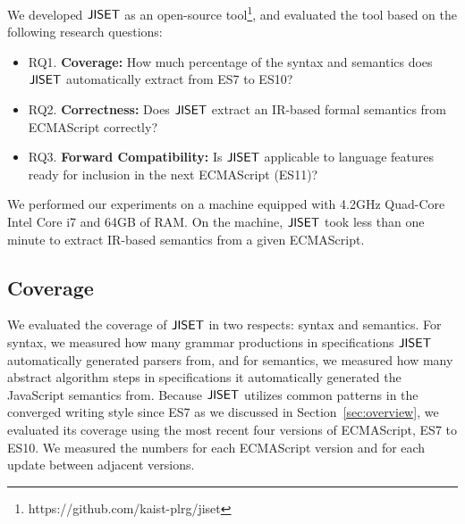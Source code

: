 We developed \( \text{\sf JISET} \) as an open-source
tool\footnote{https://github.com/kaist-plrg/jiset}, and evaluated the tool based
on the following research questions:
\begin{itemize}[leftmargin=0.5cm]
\item RQ1. \textbf{Coverage:} How much percentage of 
the syntax and semantics does \( \text{\sf JISET} \) automatically extract from ES7 to ES10?
\item RQ2. \textbf{Correctness:} Does \( \text{\sf JISET} \) extract an IR-based formal
semantics from ECMAScript correctly?
\item RQ3. \textbf{Forward Compatibility:} Is \( \text{\sf JISET} \) applicable to language
features ready for inclusion in the next ECMAScript (ES11)?
\end{itemize}
We performed our experiments on a machine equipped with 4.2GHz Quad-Core Intel
Core i7 and 64GB of RAM.  On the machine, \( \text{\sf JISET} \) took less than one minute
to extract IR-based semantics from a given ECMAScript.


\subsection{Coverage}

We evaluated the coverage of \( \text{\sf JISET} \) in two respects: syntax
and semantics.  For syntax, we measured how many grammar
productions in specifications \( \text{\sf JISET} \) automatically generated
parsers from, and for semantics, we measured how many abstract
algorithm steps in specifications it automatically generated the
JavaScript semantics from.  Because \( \text{\sf JISET} \) utilizes common
patterns in the converged writing style since ES7 as we discussed in
Section~\ref{sec:overview}, we evaluated its coverage using the most
recent four versions of ECMAScript, ES7 to ES10.  We measured the
numbers for each ECMAScript version and for each update between
adjacent versions.


